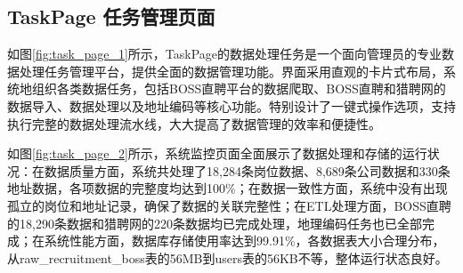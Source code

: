 \subsection{TaskPage 任务管理页面}
如图\ref{fig:task_page_1}所示，TaskPage的数据处理任务是一个面向管理员的专业数据处理任务管理平台，提供全面的数据管理功能。界面采用直观的卡片式布局，系统地组织各类数据任务，包括BOSS直聘平台的数据爬取、BOSS直聘和猎聘网的数据导入、数据处理以及地址编码等核心功能。特别设计了一键式操作选项，支持执行完整的数据处理流水线，大大提高了数据管理的效率和便捷性。

如图\ref{fig:task_page_2}所示，系统监控页面全面展示了数据处理和存储的运行状况：在数据质量方面，系统共处理了18,284条岗位数据、8,689条公司数据和330条地址数据，各项数据的完整度均达到100\%；在数据一致性方面，系统中没有出现孤立的岗位和地址记录，确保了数据的关联完整性；在ETL处理方面，BOSS直聘的18,290条数据和猎聘网的220条数据均已完成处理，地理编码任务也已全部完成；在系统性能方面，数据库存储使用率达到99.91\%，各数据表大小合理分布，从raw\_recruitment\_boss表的56MB到users表的56KB不等，整体运行状态良好。



